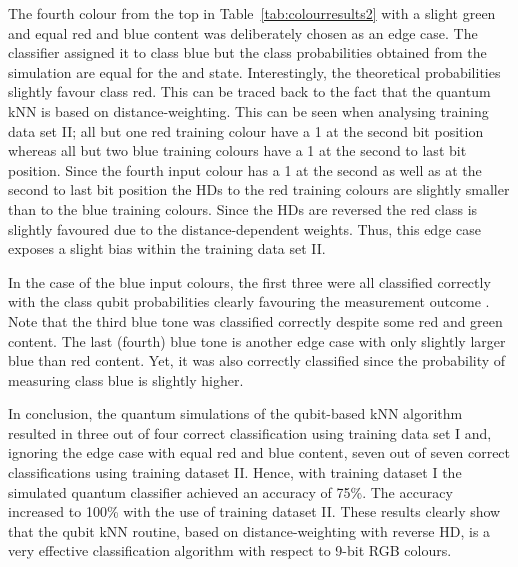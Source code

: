 The fourth colour from the top in Table~\ref{tab:colourresults2} with a slight green and equal red and blue content was deliberately chosen as an edge case. The classifier assigned it to class blue but the class probabilities obtained from the simulation are equal for the \0 and \1 state. Interestingly, the theoretical probabilities slightly favour class red. This can be traced back to the fact that the quantum kNN is based on distance-weighting. This can be seen when analysing training data set II; all but one red training colour have a 1 at the second bit position whereas all but two blue training colours have a 1 at the second to last bit position. Since the fourth input colour has a 1 at the second as well as at the second to last bit position the HDs to the red training colours are slightly smaller than to the blue training colours. Since the HDs are reversed the red class is slightly favoured due to the distance-dependent weights. Thus, this edge case exposes a slight bias within the training data set II.

In the case of the blue input colours, the first three were all classified correctly with the class qubit probabilities clearly favouring the measurement outcome \1. Note that the third blue tone was classified correctly despite some red and green content.  The last (fourth) blue tone is another edge case with only slightly larger blue than red content. Yet, it was also correctly classified since the probability of measuring class blue is slightly higher. 

In conclusion, the quantum simulations of the qubit-based kNN algorithm resulted in three out of four correct classification using training data set I and, ignoring the edge case with equal red and blue content, seven out of seven correct classifications using training dataset II. Hence, with training dataset I the simulated quantum classifier achieved an accuracy of 75\%. The accuracy increased to 100\% with the use of training dataset II. These results clearly show that the qubit kNN routine, based on distance-weighting with reverse HD, is a very effective classification algorithm with respect to 9-bit RGB colours.

